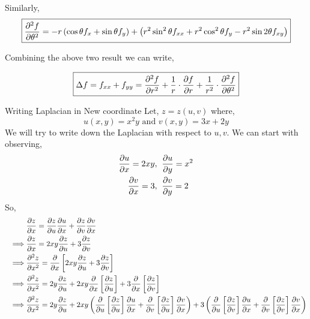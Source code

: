 \documentclass[../Analysis-3.tex]{subfiles}
\begin{document}
Similarly, \[ \boxed{\pdv[2]{f}{\theta} = -r \left( \cos{\theta} f_x + \sin{\theta} f_y \right) + \left( r^2\sin^2 \theta f_{xx} + r^2\cos^2 \theta f_{y} - r^2\sin 2 \theta f_{xy} \right)} \]

Combining the above two result we can write,

\[ \boxed{\Delta f = f_{xx} + f_{yy} = \pdv[2]{f}{r} + \frac{1}{r}\cdot\pdv{f}{r} + \frac{1}{r^2}\cdot\pdv[2]{f}{\theta}} \]

\begin{Eg}{Writing Laplacian in New coordinate}{}
    Let, $z = z(u,v)$ where, \[ u(x,y) = x^2y \text{ and } v(x,y) = 3x + 2y \]
    We will try to write down the Laplacian with respect to $u,v$. We can start with observing, \begin{align*}
        \pdv{u}{x} = 2xy, \hspace*{0.2cm} & \pdv{u}{y} = x^2 \\
        \pdv{v}{x} = 3, \hspace*{0.2cm}   & \pdv{v}{y} = 2
    \end{align*}
    So,
    \begin{align*}
        \hspace{1cm} & \pdv{z}{x} = \pdv{z}{u} \pdv{u}{x} + \pdv{z}{v} \pdv{v}{x}                                                                                                                                                                                                  \\
        \implies     & \pdv{z}{x} = 2xy \pdv{z}{u} + 3 \pdv{z}{v}                                                                                                                                                                                                                  \\
        \implies     & \pdv[2]{z}{x} = \pdv{}{x} \left[ 2xy \pdv{z}{u} + 3 \pdv{z}{v} \right]                                                                                                                                                                                      \\
        \implies     & \pdv[2]{z}{x} = 2y \pdv{z}{u} + 2xy \pdv{}{x} \left[\pdv{z}{u}\right]  + 3\pdv{}{x} \left[\pdv{z}{v}\right]                                                                                                                                                 \\
        \implies     & \pdv[2]{z}{x} = 2y \pdv{z}{u} + 2xy \left(\pdv{}{u} \left[\pdv{z}{u}\right] \pdv{u}{x} + \pdv{}{v} \left[\pdv{z}{u}\right] \pdv{v}{x}\right)  + 3\left( \pdv{}{u} \left[\pdv{z}{v}\right] \pdv{u}{x} + \pdv{}{v} \left[\pdv{z}{v}\right] \pdv{v}{x} \right) \\

\end{align*}
\end{Eg}
\end{document}
